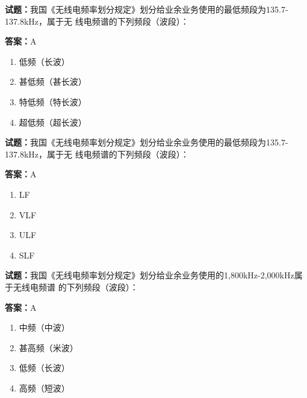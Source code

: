 \documentclass{ctexbook}
\begin{document}




\vspace{1em}

\textbf{试题：}我国《无线电频率划分规定》划分给业余业务使用的最低频段为135.7-137.8kHz，属于无
线电频谱的下列频段（波段）： 

\textbf{答案：}A 

\begin{enumerate}[leftmargin=3em]
  \item 低频（长波） 

  \item 甚低频（甚长波） 

  \item 特低频（特长波） 

  \item 超低频（超长波） 

\end{enumerate}





\vspace{1em}

\textbf{试题：}我国《无线电频率划分规定》划分给业余业务使用的最低频段为135.7-137.8kHz，属于无
线电频谱的下列频段（波段）： 

\textbf{答案：}A 

\begin{enumerate}[leftmargin=3em]
  \item LF 

  \item VLF 

  \item ULF 

  \item SLF 

\end{enumerate}





\vspace{1em}

\textbf{试题：}我国《无线电频率划分规定》划分给业余业务使用的1,800kHz-2,000kHz属于无线电频谱
的下列频段（波段）： 

\textbf{答案：}A 

\begin{enumerate}[leftmargin=3em]
  \item 中频（中波） 

  \item 甚高频（米波） 

  \item 低频（长波） 

  \item 高频（短波） 

\end{enumerate}
\end{document}

